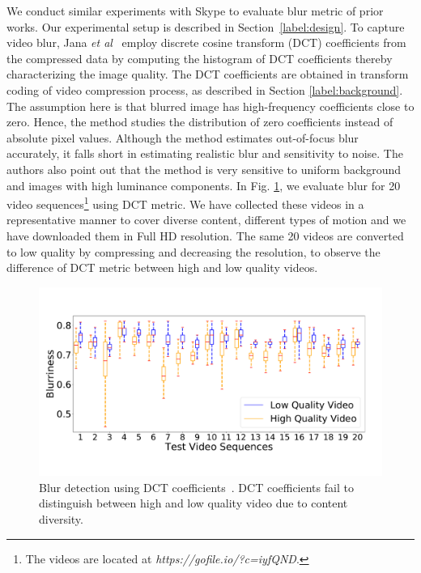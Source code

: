 We conduct similar experiments with Skype to evaluate blur metric of prior works. 
Our experimental setup is described in Section~\ref{label:design}. 
To capture video blur, Jana {\em et al}~\cite{jana2016qoe}  employ discrete cosine transform (DCT) coefficients \cite{marichal1999blur} from the compressed data by computing the histogram of DCT coefficients thereby characterizing the image quality. 
The DCT coefficients are obtained in transform coding of video compression process, as described in Section \ref{label:background}. 
The assumption here is that blurred image has high-frequency coefficients close to zero. 
Hence, the method studies the distribution of zero coefficients instead of absolute pixel values. 
Although the method estimates out-of-focus blur accurately, it falls short in estimating realistic blur and sensitivity to noise. 
The authors also point out that the method is very sensitive to uniform background and images with high luminance components. 
In Fig. \ref{fig:ucdavis}, we evaluate blur for 20 video sequences\footnote{\scriptsize{The videos are located at \textit{https://gofile.io/?c=iyfQND}.}} using DCT metric. 
We have collected these videos in a representative manner to cover diverse content, different types of motion and we have downloaded them in Full HD resolution. 
The same 20 videos are converted to low quality by compressing and decreasing the resolution, to observe the difference of DCT metric between high and low quality videos.

\begin{figure}[t]
	\centering
	\includegraphics[width=\linewidth]{sections/network-work/dct-blur}
	\caption{Blur detection using DCT coefficients~\cite{jana2016qoe,marichal1999blur}. DCT coefficients fail to distinguish between high and low quality video due to content diversity.}
	\label{fig:ucdavis}
\end{figure}

